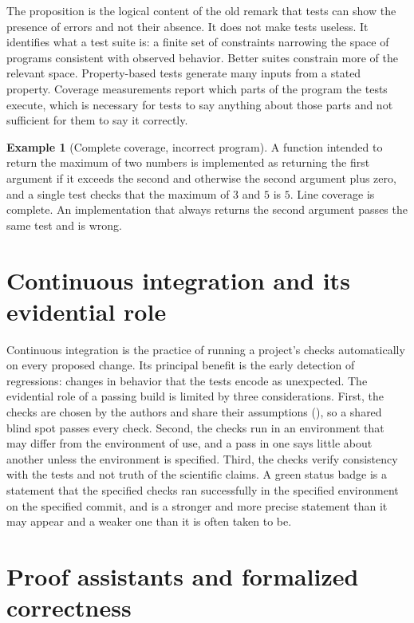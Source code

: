 \documentclass[11pt,twoside,openright]{book}
\theoremstyle{plain}
\theoremstyle{definition}
\newtheorem{example}[theorem]{Example}
\theoremstyle{remark}
\begin{document}
The proposition is the logical content of the old remark that tests can show the presence of errors and not their absence. It does not make tests useless. It identifies what a test suite is: a finite set of constraints narrowing the space of programs consistent with observed behavior. Better suites constrain more of the relevant space. Property-based tests generate many inputs from a stated property. Coverage measurements report which parts of the program the tests execute, which is necessary for tests to say anything about those parts and not sufficient for them to say it correctly.

\begin{example}[Complete coverage, incorrect program]\label{ex:coverage}
A function intended to return the maximum of two numbers is implemented as returning the first argument if it exceeds the second and otherwise the second argument plus zero, and a single test checks that the maximum of $3$ and $5$ is $5$. Line coverage is complete. An implementation that always returns the second argument passes the same test and is wrong.
\end{example}

\section{Continuous integration and its evidential role}

Continuous integration is the practice of running a project's checks automatically on every proposed change. Its principal benefit is the early detection of regressions: changes in behavior that the tests encode as unexpected. The evidential role of a passing build is limited by three considerations. First, the checks are chosen by the authors and share their assumptions (), so a shared blind spot passes every check. Second, the checks run in an environment that may differ from the environment of use, and a pass in one says little about another unless the environment is specified. Third, the checks verify consistency with the tests and not truth of the scientific claims. A green status badge is a statement that the specified checks ran successfully in the specified environment on the specified commit, and is a stronger and more precise statement than it may appear and a weaker one than it is often taken to be.

\section{Proof assistants and formalized correctness}
\end{document}
